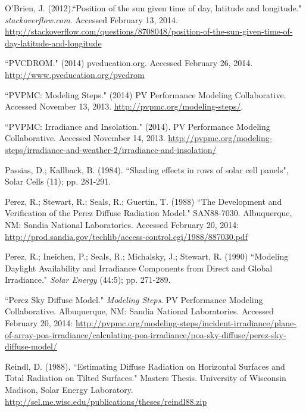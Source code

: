 \documentclass[12pt,letterpaper]{article}
\begin{document}
\begin{thebibliography}{99}
 O'Brien, J. (2012).``Position of the sun given time of day, latitude and longitude." \textit{stackoverflow.com}. Accessed February 13, 2014. \url{http://stackoverflow.com/questions/8708048/position-of-the-sun-given-time-of-day-latitude-and-longitude}

 ``PVCDROM." (2014) pveducation.org. Accessed February 26, 2014. \url{http://www.pveducation.org/pvcdrom}

``PVPMC: Modeling Steps." (2014) PV Performance Modeling Collaborative. Accessed November 13, 2013. \url{http://pvpmc.org/modeling-steps/}.

 ``PVPMC: Irradiance and Insolation." (2014). PV Performance Modeling Collaborative. Accessed November 14, 2013. \url{http://pvpmc.org/modeling-steps/irradiance-and-weather-2/irradiance-and-insolation/}

 Passias, D.; Kallback, B.  (1984). ``Shading effects in rows of solar cell panels", Solar Cells (11); pp. 281-291.

 Perez, R.; Stewart, R.; Seals, R.; Guertin, T. (1988) ``The Development and Verification of the Perez Diffuse Radiation Model." SAN88-7030. Albuquerque, NM: Sandia National Laboratories. Accessed February 20, 2014: \url{http://prod.sandia.gov/techlib/access-control.cgi/1988/887030.pdf}

 Perez, R.; Ineichen, P.; Seals, R.; Michalsky, J.; Stewart, R. (1990) ``Modeling Daylight Availability and Irradiance Components from Direct and Global Irradiance." \textit{Solar Energy} (44:5); pp. 271-289.

 ``Perez Sky Diffuse Model."  \textit{Modeling Steps}. PV Performance Modeling Collaborative. Albuquerque, NM: Sandia National Laboratories.  Accessed February 20, 2014: \url{http://pvpmc.org/modeling-steps/incident-irradiance/plane-of-array-poa-irradiance/calculating-poa-irradiance/poa-sky-diffuse/perez-sky-diffuse-model/}

 Reindl, D. (1988). ``Estimating Diffuse Radiation on Horizontal Surfaces and Total Radiation on Tilted Surfaces." Masters Thesis. University of Wisconsin Madison, Solar Energy Laboratory. \url{http://sel.me.wisc.edu/publications/theses/reindl88.zip}


\end{thebibliography}
\end{document}
